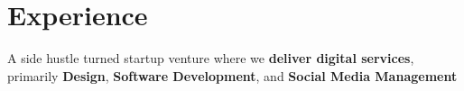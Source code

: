 \documentclass[]{deedy-resume-openfont}
\begin{document}
\begin{minipage}[t]{0.33\textwidth}

%
%

\end{minipage} 
\hfill
\begin{minipage}[t]{0.66\textwidth} 


\section{Experience}
\sectionsep

\sectionsep
\begin{tightemize}
\item A side hustle turned startup venture where we \textbf{deliver digital services}, primarily \textbf{Design}, \textbf{Software Development}, and \textbf{Social Media Management}
\end{tightemize}
\sectionsep


\end{minipage}
\end{document}
